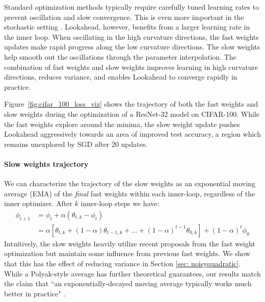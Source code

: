 \documentclass{article}
\begin{document}
Standard optimization methods typically require carefully tuned learning rates to prevent oscillation and slow convergence. This is even more important in the stochastic setting \citep{martens2014new, wu2018understanding}. Lookahead, however, benefits from a larger learning rate in the inner loop. When oscillating in the high curvature directions, the fast weights updates make rapid progress along the low curvature directions. The slow weights help smooth out the oscillations through the parameter interpolation. The combination of fast weights and slow weights improves learning in high curvature directions, reduces variance, and enables Lookahead to converge rapidly in practice.  

Figure~\ref{fig:cifar_100_loss_viz} shows the trajectory of both the fast weights and slow weights during the optimization of a ResNet-32 model on CIFAR-100. While the fast weights explore around the minima, the slow weight update pushes Lookahead aggressively towards an area of improved test accuracy, a region which remains unexplored by SGD after 20 updates. 

\paragraph{Slow weights trajectory} We can characterize the trajectory of the slow weights as an exponential moving average (EMA) of the \emph{final} fast weights within each inner-loop, regardless of the inner optimizer. {After $k$ inner-loop steps we have: \begin{align}
    \phi_{t+1} &= \phi_{t} + \alpha (\theta_{t,k} - \phi_{t}) \\
     &= \alpha [\theta_{t,k} + (1-\alpha)\theta_{t-1,k} + \ldots + (1-\alpha)^{t-1} \theta_{0,k}] + (1-\alpha)^t \phi_0
\end{align}}
Intuitively, the slow weights heavily utilize recent proposals from the fast weight optimization but maintain some influence from previous fast weights. We show that this has the effect of reducing variance in Section \ref{sec: noisyquadratic}. While a Polyak-style average has further theoretical guarantees, our results match the claim that ``an exponentially-decayed moving average typically works much better in practice" \citep{martens2014new}.
\end{document}
